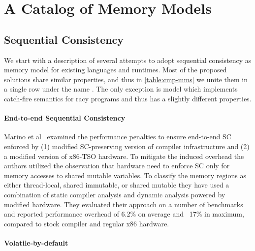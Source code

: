 \section{A Catalog of Memory Models}
\label{sec:catalog}





\subsection{Sequential Consistency}
\label{sec:catalog:sc}

We start with a description of several attempts 
to adopt sequential consistency as memory model for 
existing languages and runtimes. 
Most of the proposed solutions share similar properties, 
and thus in \cref{table:cmp-mms} we unite them 
in a single row under the name \SC. 
The only exception is \DRFx model which implements
catch-fire semantics for racy programs 
and thus has a slightly different properties. 

\paragraph{End-to-end Sequential Consistency}

Marino et al~\cite{Marino-al:PLDI11, Singh-al:ISCA12} 
examined the performance penalties to ensure end-to-end SC
enforced by (1) modified SC-preserving version 
of \LLVM compiler infrastructure and 
(2) a modified version of x86-TSO hardware. 
To mitigate the induced overhead the authors 
utilized the observation that hardware need to 
enforce SC only for memory accesses to shared mutable variables. 
To classify the memory regions as either thread-local,
shared immutable, or shared mutable they have used 
a combination of static compiler analysis and 
dynamic analysis powered by modified hardware. 
They evaluated their approach on a number of benchmarks
and reported performance overhead of 6.2\% on average 
and ~17\% in maximum, compared to stock \LLVM compiler 
and regular x86 hardware. 

\paragraph{Volatile-by-default}

